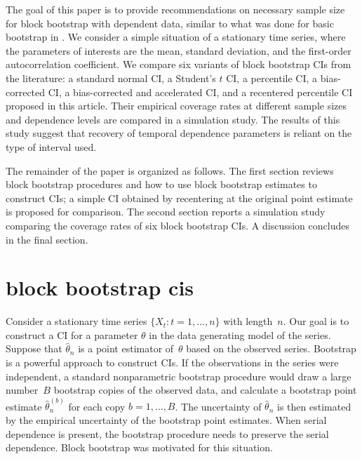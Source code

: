 \documentclass[10pt]{article}
\begin{document}
The goal of this paper is to provide recommendations on necessary sample size 
for block bootstrap with dependent data, similar to what was done for basic 
bootstrap in \citet{hesterberg2015teachers}. We consider a simple situation of 
a stationary time series, where the parameters of interests are the mean, 
standard deviation, and the first-order autocorrelation coefficient. We compare 
six variants of block bootstrap CIs from the 
literature:\citep{diciccio1996bootstrap, rice2006mathematical} a standard normal 
CI, a 
Student's $t$ CI, a percentile CI, a bias-corrected CI, a bias-corrected and 
accelerated CI, and a recentered percentile CI proposed in this article. Their 
empirical coverage rates at different sample sizes and dependence levels are 
compared in a simulation study. The results of this study suggest that recovery 
of temporal dependence parameters is reliant on the type of interval used.



The remainder of the paper is organized as follows. The first section 
reviews block bootstrap procedures and how to use block bootstrap estimates to
construct CIs; a simple CI obtained by recentering at the original point 
estimate is proposed for comparison. The second section reports a simulation 
study comparing the coverage rates of six block bootstrap CIs. A discussion
concludes in the final section.

\section*{block bootstrap cis}
\label{sec:bbci}

Consider a stationary time series $\{X_t: t = 1, \ldots, n\}$ with length~$n$. 
Our goal is to construct a CI for a parameter $\theta$ in the data generating 
model of the series. Suppose that $\hat\theta_n$ is a point estimator 
of~$\theta$ based on the observed series. Bootstrap is a powerful approach to
construct CIs. If the observations in the series were independent, a standard
nonparametric bootstrap procedure would draw a large number~$B$ bootstrap copies 
of the observed data, and calculate a bootstrap point estimate 
$\hat\theta_n^{(b)}$ for each copy $b = 1, \ldots, B$. The uncertainty of 
$\hat\theta_n$ is then estimated by the empirical uncertainty of the bootstrap 
point estimates. When serial dependence is present, the bootstrap procedure 
needs to preserve the serial dependence. Block bootstrap was motivated for this 
situation. 
\end{document}
